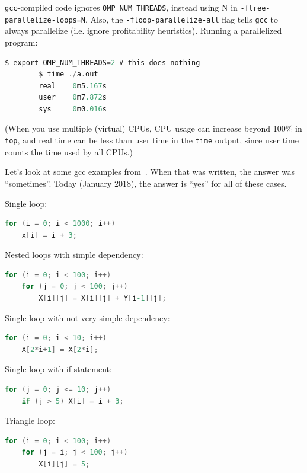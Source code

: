 \documentclass[a4paper]{report}
\begin{document}
{\tt gcc}-compiled code ignores \verb+OMP_NUM_THREADS+, instead using N in {\tt -ftree-parallelize-loops=N}. Also, the {\tt -floop-parallelize-all} flag tells {\tt gcc} to always parallelize (i.e. ignore profitability heuristics). Running a parallelized program:
\begin{lstlisting}[language=C]
        $ export OMP_NUM_THREADS=2 # this does nothing
        $ time ./a.out
        real    0m5.167s
        user    0m7.872s
        sys     0m0.016s
\end{lstlisting}

(When you use multiple (virtual) CPUs, CPU usage can increase beyond
100\% in {\tt top}, and real time can be less than user time in
the {\tt time} output, since user time counts the time used by all CPUs.)

Let's look at some gcc examples from~\cite{autopar:related}. When that was written, the answer was ``sometimes''.
Today (January 2018), the answer is ``yes'' for all of these cases.

  Single loop:
  \begin{lstlisting}[language=C]
for (i = 0; i < 1000; i++)
    x[i] = i + 3;
  \end{lstlisting}

  Nested loops with simple dependency:
  \begin{lstlisting}[language=C]
for (i = 0; i < 100; i++)
    for (j = 0; j < 100; j++)
        X[i][j] = X[i][j] + Y[i-1][j];
  \end{lstlisting}

  Single loop with not-very-simple dependency:
  \begin{lstlisting}[language=C]
for (i = 0; i < 10; i++)
    X[2*i+1] = X[2*i];
  \end{lstlisting}

  Single loop with if statement:
  \begin{lstlisting}[language=C]
for (j = 0; j <= 10; j++)
    if (j > 5) X[i] = i + 3;
  \end{lstlisting}

  Triangle loop:
  \begin{lstlisting}[language=C]
for (i = 0; i < 100; i++)
    for (j = i; j < 100; j++)
        X[i][j] = 5;
  \end{lstlisting}
\end{document}
